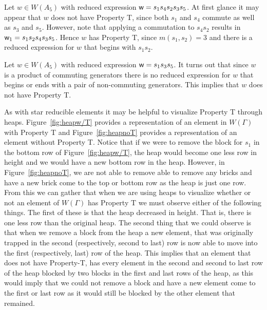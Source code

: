 \begin{example}\label{ex:prop-T}
Let $w \in W(A_5)$ with reduced expression $\mathsf{w}=s_1s_4s_2s_3s_5$. At first glance it may appear that $w$ does not have Property T, since both $s_1$ and $s_4$ commute as well as $s_3$ and $s_5$. However, note that applying a commutation to $s_4s_2$ results in $\mathsf{w}_1=s_1s_2s_4s_3s_5$. Hence $w$ has Property T, since $m(s_1,s_2)=3$ and there is a reduced expression for $w$ that begins with $s_1s_2$.	
\end{example}

\begin{example}\label{ex:tavoid}
Let $w \in W(A_5)$ with reduced expression $\mathsf{w}=s_1s_3s_5$. It turns out that since $w$ is a product of commuting generators there is no reduced expression for $w$ that begins or ends with a pair of non-commuting generators. This implies that $w$ does not have Property T.	
\end{example}

As with star reducible elements it may be helpful to visualize Property T through heaps. Figure~\ref{fig:heapw/T} provides a representation of an element in $W(\Gamma)$ with Property T and Figure~\ref{fig:heapnoT} provides a representation of an element without Property T. Notice that if we were to remove the block for $s_1$ in the bottom row of Figure~\ref{fig:heapw/T}, the heap would become one less row in height and we would have a new bottom row in the heap. However, in Figure~\ref{fig:heapnoT}, we are not able to remove able to remove any bricks and have a new brick come to the top or bottom row as the heap is just one row. From this we can gather that when we are using heaps to visualize whether or not an element of $W(\Gamma)$ has Property T we must observe either of the following things. The first of these is that the heap decreased in height. That is, there is one less row than the original heap. The second thing that we could observe is that when we remove a block from the heap a new element, that was originally trapped in the second (respectively, second to last) row is now able to move into the first (respectively, last) row of the heap. This implies that an element that does not have Property-T, has every element in the second and second to last row of the heap blocked by two blocks in the first and last rows of the heap, as this would imply that we could not remove a block and have a new element come to the first or last row as it would still be blocked by the other element that remained.

